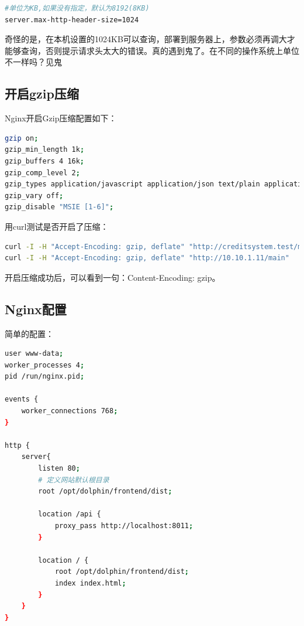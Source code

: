 \documentclass[letter]{book}
\begin{document}
\begin{lstlisting}[language=bash]
#单位为KB,如果没有指定，默认为8192(8KB)
server.max-http-header-size=1024
\end{lstlisting}

奇怪的是，在本机设置的1024KB可以查询，部署到服务器上，参数必须再调大才能够查询，否则提示请求头太大的错误。真的遇到鬼了。在不同的操作系统上单位不一样吗？见鬼

\subsection{开启gzip压缩}

Nginx开启Gzip压缩配置如下：

\begin{lstlisting}[language=Bash]
gzip on;
gzip_min_length 1k;
gzip_buffers 4 16k;
gzip_comp_level 2;
gzip_types application/javascript application/json text/plain application/x-javascript text/css application/xml text/javascript application/x-httpd-php image/jpeg image/gif image/png;
gzip_vary off;
gzip_disable "MSIE [1-6]";
\end{lstlisting}

用curl测试是否开启了压缩：

\begin{lstlisting}[language=Bash]
curl -I -H "Accept-Encoding: gzip, deflate" "http://creditsystem.test/main"
curl -I -H "Accept-Encoding: gzip, deflate" "http://10.10.1.11/main"
\end{lstlisting}

开启压缩成功后，可以看到一句：Content-Encoding: gzip。

\subsection{Nginx配置}

简单的配置：

\begin{lstlisting}[language=bash]
user www-data;
worker_processes 4;
pid /run/nginx.pid;

events {
	worker_connections 768;
}

http {
	server{
		listen 80;
		# 定义网站默认根目录
		root /opt/dolphin/frontend/dist;
		
		location /api {
			proxy_pass http://localhost:8011;
		}
		
		location / {
			root /opt/dolphin/frontend/dist;
			index index.html;
		} 
	}
}
\end{lstlisting}
\end{document}
